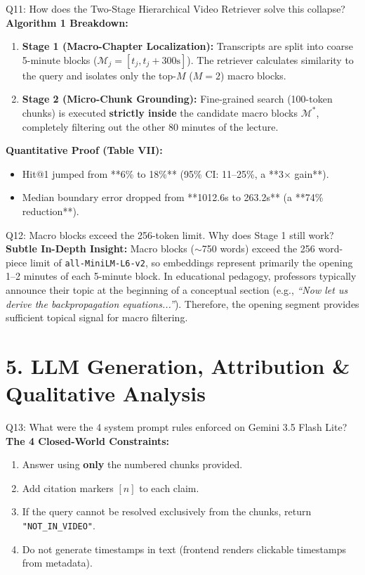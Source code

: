 \documentclass[10pt,a4paper]{article}
\begin{document}
\begin{quesbox}{Q11: How does the Two-Stage Hierarchical Video Retriever solve this collapse?}
\textbf{Algorithm 1 Breakdown:}
\begin{enumerate}[leftmargin=*]
    \item \textbf{Stage 1 (Macro-Chapter Localization):} Transcripts are split into coarse 5-minute blocks ($\mathcal{M}_j = [t_j, t_j + 300\text{s}]$). The retriever calculates similarity to the query and isolates only the top-$M$ ($M=2$) macro blocks.
    \item \textbf{Stage 2 (Micro-Chunk Grounding):} Fine-grained search (100-token chunks) is executed \textbf{strictly inside} the candidate macro blocks $\mathcal{M}^*$, completely filtering out the other 80 minutes of the lecture.
\end{enumerate}
\textbf{Quantitative Proof (Table VII):}
\begin{itemize}[leftmargin=*]
    \item Hit@1 jumped from **6\% to 18\%** (95\% CI: 11--25\%, a **3$\times$ gain**).
    \item Median boundary error dropped from **1012.6s to 263.2s** (a **74\% reduction**).
\end{itemize}
\end{quesbox}

\begin{quesbox}{Q12: Macro blocks exceed the 256-token limit. Why does Stage 1 still work?}
\textbf{Subtle In-Depth Insight:}
Macro blocks ($\sim$750 words) exceed the 256 word-piece limit of \texttt{all-MiniLM-L6-v2}, so embeddings represent primarily the opening 1--2 minutes of each 5-minute block. In educational pedagogy, professors typically announce their topic at the beginning of a conceptual section (e.g., \textit{``Now let us derive the backpropagation equations...''}). Therefore, the opening segment provides sufficient topical signal for macro filtering.
\end{quesbox}

\section*{\color{primary} 5. LLM Generation, Attribution \& Qualitative Analysis}

\begin{quesbox}{Q13: What were the 4 system prompt rules enforced on Gemini 3.5 Flash Lite?}
\textbf{The 4 Closed-World Constraints:}
\begin{enumerate}[leftmargin=*]
    \item Answer using \textbf{only} the numbered chunks provided.
    \item Add citation markers $[n]$ to each claim.
    \item If the query cannot be resolved exclusively from the chunks, return \texttt{"NOT\_IN\_VIDEO"}.
    \item Do not generate timestamps in text (frontend renders clickable timestamps from metadata).
\end{enumerate}
\end{quesbox}
\end{document}

